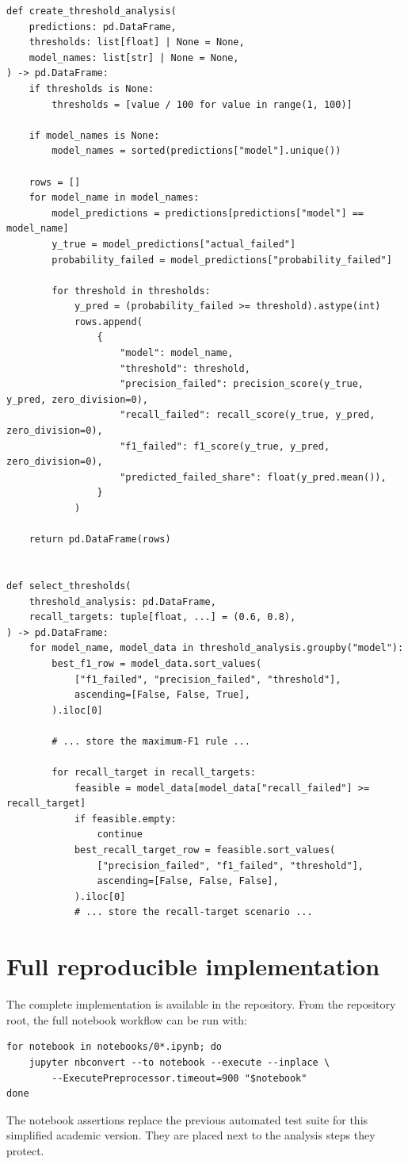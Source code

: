 \documentclass[10pt]{article}
\begin{document}
\begin{lstlisting}
def create_threshold_analysis(
    predictions: pd.DataFrame,
    thresholds: list[float] | None = None,
    model_names: list[str] | None = None,
) -> pd.DataFrame:
    if thresholds is None:
        thresholds = [value / 100 for value in range(1, 100)]

    if model_names is None:
        model_names = sorted(predictions["model"].unique())

    rows = []
    for model_name in model_names:
        model_predictions = predictions[predictions["model"] == model_name]
        y_true = model_predictions["actual_failed"]
        probability_failed = model_predictions["probability_failed"]

        for threshold in thresholds:
            y_pred = (probability_failed >= threshold).astype(int)
            rows.append(
                {
                    "model": model_name,
                    "threshold": threshold,
                    "precision_failed": precision_score(y_true, y_pred, zero_division=0),
                    "recall_failed": recall_score(y_true, y_pred, zero_division=0),
                    "f1_failed": f1_score(y_true, y_pred, zero_division=0),
                    "predicted_failed_share": float(y_pred.mean()),
                }
            )

    return pd.DataFrame(rows)


def select_thresholds(
    threshold_analysis: pd.DataFrame,
    recall_targets: tuple[float, ...] = (0.6, 0.8),
) -> pd.DataFrame:
    for model_name, model_data in threshold_analysis.groupby("model"):
        best_f1_row = model_data.sort_values(
            ["f1_failed", "precision_failed", "threshold"],
            ascending=[False, False, True],
        ).iloc[0]

        # ... store the maximum-F1 rule ...

        for recall_target in recall_targets:
            feasible = model_data[model_data["recall_failed"] >= recall_target]
            if feasible.empty:
                continue
            best_recall_target_row = feasible.sort_values(
                ["precision_failed", "f1_failed", "threshold"],
                ascending=[False, False, False],
            ).iloc[0]
            # ... store the recall-target scenario ...
\end{lstlisting}

\section{Full reproducible implementation}

The complete implementation is available in the repository. From the repository
root, the full notebook workflow can be run with:

\begin{verbatim}
for notebook in notebooks/0*.ipynb; do
    jupyter nbconvert --to notebook --execute --inplace \
        --ExecutePreprocessor.timeout=900 "$notebook"
done
\end{verbatim}

The notebook assertions replace the previous automated test suite for this
simplified academic version. They are placed next to the analysis steps they
protect.
\end{document}

